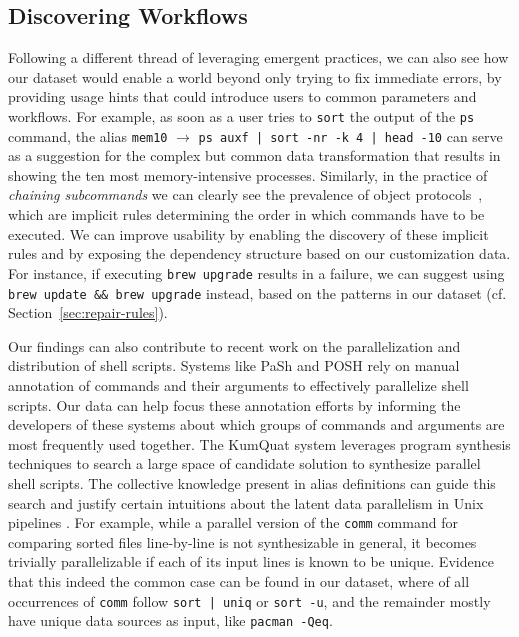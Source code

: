 \documentclass[sigconf,nonacm,screen]{acmart}
\newcommand{\per}[1]{\numprint[\%]{#1}}
\newcommand{\alias}[2]{{\texttt{#1} $\rightarrow$ \texttt{#2}}}
\newcommand{\cmd}[1]{{\texttt{#1}}}
\begin{document}
\subsection{Discovering Workflows}
\label{sec:discovering-workflows}

Following a different thread of leveraging emergent practices, we can also see how our dataset would enable a world beyond only trying to fix immediate errors, by providing usage hints that could introduce users to common parameters and workflows.
For example, as soon as a user tries to \cmd{sort} the output of the \cmd{ps} command, the alias \alias{mem10}{ps auxf | sort -nr -k 4 | head -10} can serve as a suggestion for the complex but common data transformation that results in showing the ten most memory-intensive processes.
Similarly, in the practice of \emph{chaining subcommands} we can clearly see the prevalence of object protocols~\citep{beckman:11}, which are implicit rules determining the order in which commands have to be executed.
We can improve usability by enabling the discovery of these implicit rules and by exposing the dependency structure based on our customization data.
For instance, if executing \verb|brew upgrade| results in a failure, we can suggest using \verb|brew update && brew upgrade| instead, based on the patterns in our dataset (cf. Section~\ref{sec:repair-rules}).

Our findings can also contribute to recent work on the parallelization and distribution of shell scripts.
Systems like PaSh \citep{pash} and POSH \citep{posh} rely on manual annotation of commands and their arguments to effectively parallelize shell scripts.
Our data can help focus these annotation efforts by informing the developers of these systems about which groups of commands and arguments are most frequently used together.
The KumQuat system \citep{kumquat} leverages program synthesis techniques to search a large space of candidate solution to synthesize parallel shell scripts.
The collective knowledge present in alias definitions can guide this search and justify certain intuitions about the latent data parallelism in Unix pipelines \citep{odfg}.
For example, while a parallel version of the \cmd{comm} command for comparing sorted files line-by-line is not synthesizable in general, it becomes trivially parallelizable if each of its input lines is known to be unique.
Evidence that this indeed the common case can be found in our dataset, where \per{41.29} of all occurrences of \cmd{comm} follow \texttt{sort~|~uniq} or \texttt{sort~-u}, and the remainder mostly have unique data sources as input, like \texttt{pacman -Qeq}.
\end{document}
